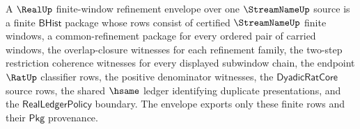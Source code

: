 \begin{definition}
\label{def:realup-finite-window-refinement-envelope}
A $\RealUp$ finite-window refinement envelope over one $\StreamNameUp$ source
is a finite $\mathsf{BHist}$ package whose rows consist of certified
$\StreamNameUp$ finite windows, a common-refinement package for every ordered
pair of carried windows, the overlap-closure witnesses for each refinement
family, the two-step restriction coherence witnesses for every displayed
subwindow chain, the endpoint $\RatUp$ classifier rows, the positive
denominator witnesses, the $\mathsf{DyadicRatCore}$ source rows, the shared
$\hsame$ ledger identifying duplicate presentations, and the
$\mathsf{RealLedgerPolicy}$ boundary. The envelope exports only these finite
rows and their $\mathsf{Pkg}$ provenance.
\end{definition}

